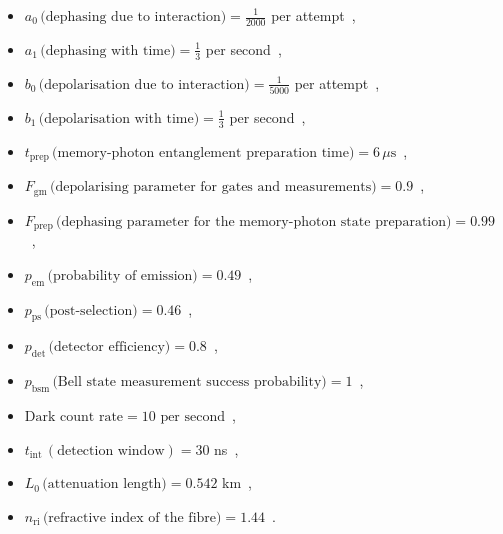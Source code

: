 \documentclass[aps,pra,reprint,superscriptaddress]{revtex4-1}
\begin{document}
\begin{itemize}
\item $a_0 \, \textrm{(dephasing due to interaction)}  = \frac{1}{2000}$ per attempt~\cite{reiserer2016robust},
\item $a_1 \, \textrm{(dephasing with time)} = \frac{1}{3}$ per second~\cite{maurer2012room},
\item $b_0 \, \textrm{(depolarisation due to interaction)} = \frac{1}{5000}$ per attempt~\cite{reiserer2016robust},
\item $b_1 \, \textrm{(depolarisation with time)} = \frac{1}{3}$ per second~\cite{maurer2012room},
\item $t_{\textrm{prep}} \, \textrm{(memory-photon entanglement preparation time)} = 6 \, \mu  \textrm{s}$~\cite{hensen2015loophole},
\item $F_{\textrm{gm}} \, \textrm{(depolarising parameter for gates and measurements)} = 0.9$~\cite{kalb2017entanglement},
\item $F_{\textrm{prep}} \, \textrm{(dephasing parameter for the memory-photon state preparation)} = 0.99$ ~\cite{hensen2015loophole},
\item $p_{\textrm{em}} \, \textrm{(probability of emission)} = 0.49$~\cite{hensen2015loophole, bogdanovic2016design},
\item $p_{\textrm{ps}} \, \textrm{(post-selection)} = 0.46$~\cite{riedel2017deterministic},
\item $p_{\textrm{det}} \, \textrm{(detector efficiency)} = 0.8$~\cite{hensen2015loophole},
\item $p_{\textrm{bsm}} \, \textrm{(Bell state measurement success probability)} =1$~\cite{pfaff2014unconditional},
\item $\textrm{Dark count rate} = 10 \, \, \textrm{per second}$~\cite{hensen2015loophole},
\item $t_{\textrm{int}}\, (\textrm{detection window}) = 30$ ns~\cite{hensen2015loophole},
\item $L_0 \, \textrm{(attenuation length)}= 0.542$ km~\cite{hensen2015loophole},
\item $n_{\textrm{ri}} \, \textrm{(refractive index of the fibre)}= 1.44$~\cite{LaserEncyclopedia}.
\end{itemize}
\end{document}
